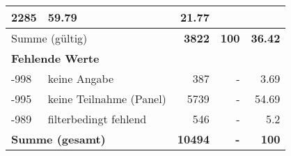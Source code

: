 \begin{longtable}{lXrrr}
       \num{2285} &
       \num[round-mode=places,round-precision=2]{59,79} &
         \num[round-mode=places,round-precision=2]{21,77} \\
     \midrule
     \multicolumn{2}{l}{Summe (gültig)} &
       \textbf{\num{3822}} &
     \textbf{100} &
       \textbf{\num[round-mode=places,round-precision=2]{36,42}} \\
     \multicolumn{5}{l}{\textbf{Fehlende Werte}}\\
       -998 &
       keine Angabe &
         \num{387} &
        - &
         \num[round-mode=places,round-precision=2]{3,69} \\
       -995 &
       keine Teilnahme (Panel) &
         \num{5739} &
        - &
         \num[round-mode=places,round-precision=2]{54,69} \\
       -989 &
       filterbedingt fehlend &
         \num{546} &
        - &
         \num[round-mode=places,round-precision=2]{5,2} \\
     \midrule
     \multicolumn{2}{l}{\textbf{Summe (gesamt)}} &
          \textbf{\num{10494}} &
        \textbf{-} &
        \textbf{100} \\
     \bottomrule
     \end{longtable}
     
